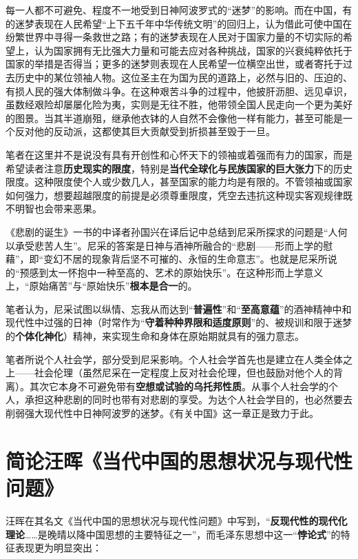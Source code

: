 每一人都不可避免、程度不一地受到日神阿波罗式的“迷梦”的影响。而在中国，有的迷梦表现在人民希望“上下五千年中华传统文明”的回归上，认为借此可使中国在纷繁世界中寻得一条救世之路；有的迷梦表现在人民对于国家力量的不切实际的希望上，认为国家拥有无比强大力量和可能去应对各种挑战，国家的兴衰纯粹依托于国家的举措是否得当；更多的迷梦则表现在人民希望一位横空出世，或者寄托于过去历史中的某位领袖人物。这位圣主在为国为民的道路上，必然与旧的、压迫的、有损人民的强大体制做斗争。在这种艰苦斗争的过程中，他披肝沥胆、远见卓识，虽数经艰险却屡屡化险为夷，实则是无往不胜，他带领全国人民走向一个更为美好的图景。当其半道崩殂，继承他衣钵的人自然不会像他一样有能力，甚至可能是一个反对他的反动派，这都使其巨大贡献受到折损甚至毁于一旦。

笔者在这里并不是说没有具有开创性和心怀天下的领袖或着强而有力的国家，而是希望读者注意\textbf{历史现实的限度}，特别是\textbf{当代全球化与民族国家的巨大张力}下的历史限度。这种限度使个人或少数几人，甚至国家的能力均是有限的。不管领袖或国家如何强力，想要超越限度的前提是必须尊重限度，凭空去违抗这种现实客观规律既不明智也会带来恶果。

《悲剧的诞生》一书的中译者孙国兴在译后记中总结到尼采所探求的问题是“人何以承受悲苦人生”。尼采的答案是日神与酒神所融合的“悲剧------形而上学的慰藉”，即“变幻不居的现象背后坚不可摧的、永恒的生命意志”。也就是尼采所说的“预感到太一怀抱中一种至高的、艺术的原始快乐”。在这种形而上学意义上，“原始痛苦”与“原始快乐”\textbf{根本是合一}的。

笔者认为，尼采试图以纵情、忘我从而达到“\textbf{普遍性}”和“\textbf{至高意蕴}”的酒神精神中和现代性中过强的日神（时常作为“\textbf{守着种种界限和适度原则}”的、被规训和限于迷梦的\textbf{个体化神化}）精神，来实现生命和身体在原始期就具有的强力意志。

笔者所说个人社会学，部分受到尼采影响。个人社会学首先也是建立在人类全体之上------社会伦理（虽然尼采在一定程度上反对社会伦理，但也鼓励对他个人的背离）。其次它本身不可避免带有\textbf{空想或试验的乌托邦性质}。从事个人社会学的个人，承担这种悲剧的同时也带有对悲剧的享受。为达个人社会学目的，也必然要去削弱强大现代性中日神阿波罗的迷梦。《有关中国》这一章正是致力于此。

\section{简论汪晖《当代中国的思想状况与现代性问题》}

汪晖在其名文《当代中国的思想状况与现代性问题》中写到，“\textbf{反现代性的现代化理论}\ldots{}\ldots{}是晚晴以降中国思想的主要特征之一”，而毛泽东思想中这一“\textbf{悖论式}”的特征表现更为明显突出：

